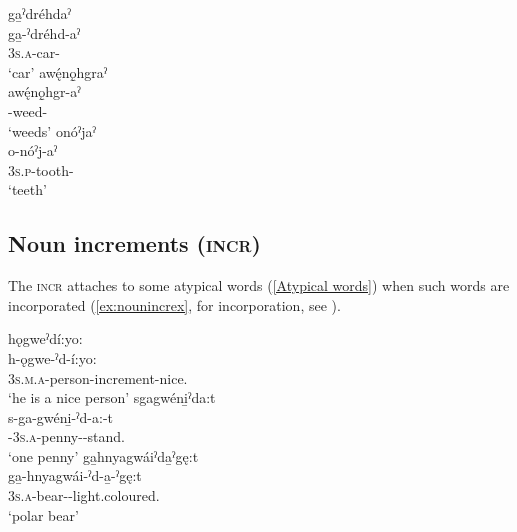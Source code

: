 \ea\label{ex:nsf}
\ea ga̱ˀdréhdaˀ\\
\gll ga̱-ˀdréhd-aˀ\\
 \textsc{3s.a}-car-{\nounstemformer}\\
\glt `car'
\ex awę́nǫ̱hgraˀ\\
\gll awę́nǫ̱hgr-aˀ\\
 {\noprefix}-weed-{\nounstemformer}\\
\glt `weeds'
\ex onóˀjaˀ\\
\gll o-nóˀj-aˀ\\
 \textsc{3s.p}-tooth-{\nounstemformer}\\
\glt `teeth'
\z
\z

\subsection{Noun increments (\textsc{incr})} \label{Noun increments}
The  \textsc{incr} attaches to some atypical words (\ref{Atypical words}) when such words are incorporated (\ref{ex:nounincrex}, for incorporation, see ). 

\ea\label{ex:nounincrex} 
\ea hǫgweˀdí:yo:\\
\gll h-ǫgwe-ˀd-í:yo:\\
 \textsc{3s.m.a}-person-{increment}-nice.{\stative}\\
\glt `he is a nice person'
\ex sgagwéni̱ˀda:t\\
\gll s-ga-gwéni̱-ˀd-a:-t\\
 {\repetitive}-\textsc{3s.a}-penny--stand.{\stative}\\
\glt `one penny'
\ex ga̱hnyagwáiˀda̱ˀgę:t\\
\gll ga̱-hnyagwái-ˀd-a̱-ˀgę:t\\
 \textsc{3s.a}-bear--light.coloured.{\stative}\\
\glt `polar bear'
\z
\z


